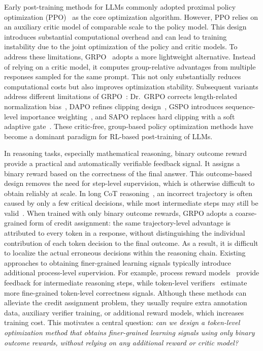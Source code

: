 \documentclass{article}
\begin{document}
Early post-training methods for LLMs commonly adopted proximal policy optimization (PPO)~\citep{ppo} as the core optimization algorithm. 
However, PPO relies on an auxiliary critic model of comparable scale to the policy model.
This design introduces substantial computational overhead and can lead to training instability due to the joint optimization of the policy and critic models.
To address these limitations, GRPO~\citep{shao2024deepseekmath} adopts a more lightweight alternative. 
Instead of relying on a critic model, it computes group-relative advantages from multiple responses sampled for the same prompt.
This not only substantially reduces computational costs but also improves optimization stability.
Subsequent variants address different limitations of GRPO~\citep{shao2024deepseekmath}: Dr.~GRPO corrects length-related normalization bias~\citep{liu2025drgrpo}, DAPO refines clipping design~\citep{yu2025dapo}, GSPO introduces sequence-level importance weighting~\citep{zhang2025gspo}, and SAPO replaces hard clipping with a soft adaptive gate~\citep{wang2025sapo}.
These critic-free, group-based policy optimization methods have become a dominant paradigm for RL-based post-training of LLMs.

In reasoning tasks, especially mathematical reasoning, binary outcome reward provide a practical and automatically verifiable feedback signal.
It assigns a binary reward based on the correctness of the final answer.
This outcome-based design removes the need for step-level supervision, which is otherwise difficult to obtain reliably at scale.
In long CoT reasoning~\citep{wei2022chain}, an incorrect trajectory is often caused by only a few critical decisions, while most intermediate steps may still be valid~\citep{lin2025critical}.
When trained with only binary outcome rewards, GRPO adopts a coarse-grained form of credit assignment: the same trajectory-level advantage is attributed to every token in a response, without distinguishing the individual contribution of each token decision to the final outcome. 
As a result, it is difficult to localize the actual erroneous decisions within the reasoning chain.
Existing approaches to obtaining finer-grained learning signals typically introduce additional process-level supervision.
For example, process reward models~\citep{lightman2023letsverify} provide feedback for intermediate reasoning steps, while token-level verifiers~\citep{lee2025tvm} estimate more fine-grained token-level correctness signals.
Although these methods can alleviate the credit assignment problem, they usually require extra annotation data, auxiliary verifier training, or additional reward models, which increases training cost.
This motivates a central question: \textit{can we design a token-level optimization method that obtains finer-grained learning signals using only binary outcome rewards, without relying on any additional reward or critic model?}
\end{document}
